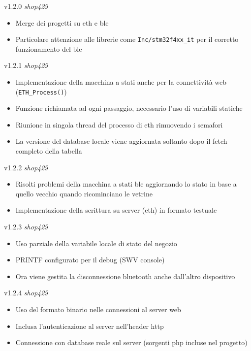 v1.2.0 \textit{shop429}
	\begin{itemize}
	\item Merge dei progetti su eth e ble
	\item Particolare attenzione alle librerie come \texttt{Inc/stm32f4xx\_it} per il corretto funzionamento del ble
	\end{itemize}
v1.2.1 \textit{shop429}
	\begin{itemize}
	\item Implementazione della macchina a stati anche per la connettivit\`{a} web (\texttt{ETH\_Process()})
	\item Funzione richiamata ad ogni passaggio, necessario l'uso di variabili statiche
	\item Riunione in singola thread del processo di eth rimuovendo i semafori
	\item La versione del database locale viene aggiornata soltanto dopo il fetch completo della tabella
	\end{itemize}
v1.2.2 \textit{shop429}
	\begin{itemize}
	\item Risolti problemi della macchina a stati ble aggiornando lo stato in base a quello vecchio quando ricominciano le vetrine
	\item Implementazione della scrittura su server (eth) in formato testuale
	\end{itemize}
v1.2.3 \textit{shop429}
	\begin{itemize}
	\item Uso parziale della variabile locale di stato del negozio
	\item PRINTF configurato per il debug (SWV console)
	\item Ora viene gestita la disconnessione bluetooth anche dall'altro dispositivo
	\end{itemize}
v1.2.4 \textit{shop429}
	\begin{itemize}
	\item Uso del formato binario nelle connessioni al server web
	\item Inclusa l'autenticazione al server nell'header http
	\item Connessione con database reale sul server (sorgenti php incluse nel progetto)
	\end{itemize}
